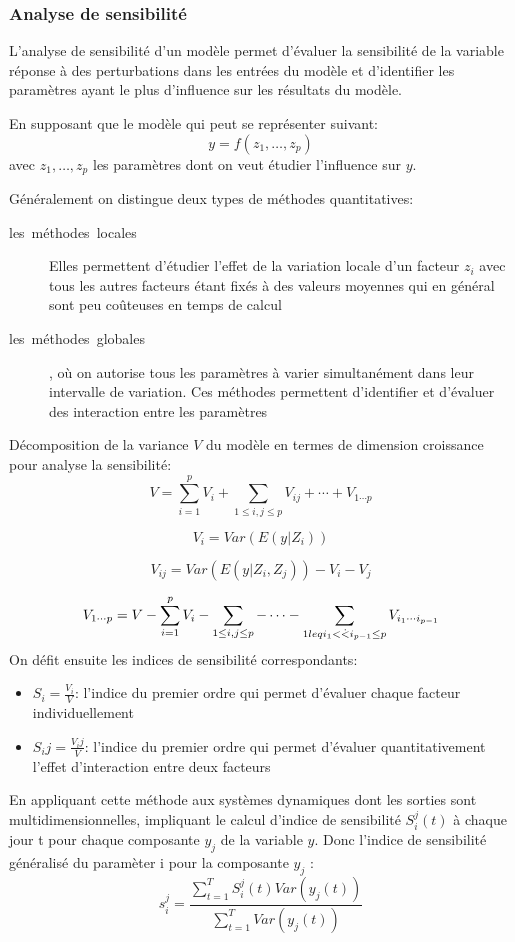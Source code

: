\subsubsection{Analyse de sensibilité}
L'analyse de sensibilité d'un modèle permet d'évaluer la sensibilité de la
variable réponse à des perturbations dans les entrées du modèle et
d'identifier les paramètres ayant le plus d'influence
sur les résultats du modèle.

En supposant que le modèle qui peut se représenter suivant:
\[
  y = f(z_1,\dots,z_p)
\]
avec $z_1,\dots ,z_p$ les paramètres dont on veut étudier l'influence sur $y$.

Généralement on distingue deux types de méthodes quantitatives:
\begin{description}
  \item[les\ méthodes\ locales] Elles permettent d'étudier l'effet de la
variation locale d'un facteur $z_i$ avec tous les autres facteurs étant fixés à des valeurs moyennes qui en général sont peu coûteuses en temps de calcul
\item[les\ méthodes\ globales], où on autorise tous les paramètres à varier simultanément dans leur intervalle de variation. Ces méthodes permettent d'identifier et d'évaluer des interaction entre les paramètres
\end{description}
Décomposition de la variance $V$ du modèle en termes de dimension croissance pour analyse la sensibilité:
\[ {V}=\sum_{i=1}^pV_i+\sum_{1\leq i,j \leq p} V_{ij}+\cdots +V_{1\cdots p}\]

\[ {V_i}=Var(E(y|Z_i))\]

\[ {V_{ij}}=Var(E(y|Z_i,Z_j))-V_i-V_j \]

\[ {V_{1\cdots p}}=V-\sum_{i=1}^p V_i-\sum_{1\leq i,j \leq p}-\cdots -\sum_{1\\leq i_1<\dot <i_{p-1}\leq p} V_{i_1 \cdots i_{p-1}} \]
On défit ensuite les indices de sensibilité correspondants:
\begin{itemize}
\item $S_i=\frac{V_i}{V}$: l'indice du premier ordre qui permet d'évaluer chaque facteur individuellement
\item $S_ij=\frac{V_ij}{V}$: l'indice du premier ordre qui permet d'évaluer quantitativement l'effet d'interaction entre deux facteurs
\end{itemize}
En appliquant cette méthode aux systèmes dynamiques dont les sorties sont multidimensionnelles, impliquant le calcul d'indice de sensibilité $S_i^j(t)$ à chaque jour t pour chaque composante $y_j$ de la variable $y$.
Donc l'indice de sensibilité généralisé du paramèter i  pour la composante $y_j$ :
\[ {s_i^j}=\frac{\sum_{t=1}^TS_i^j(t)Var(y_j(t))}{\sum_{t=1}^T Var(y_j(t))} \]